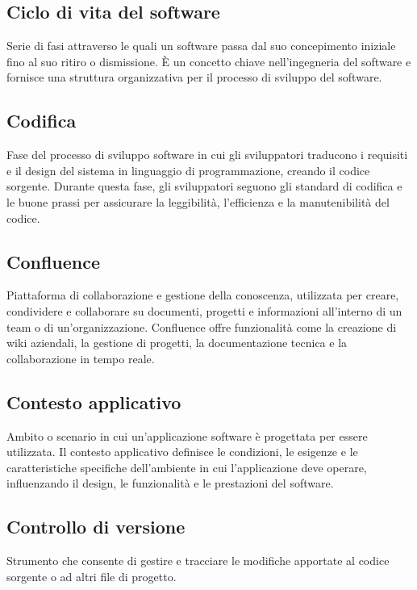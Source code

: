 \hypertarget{sec:ciclo_di_vita}{}
\subsection*{Ciclo di vita del software}
Serie di fasi attraverso le quali un software passa dal suo concepimento iniziale fino al suo ritiro o dismissione. È un concetto chiave nell'ingegneria 
del software e fornisce una struttura organizzativa per il processo di sviluppo del software.

\hypertarget{sec:codifica}{}
\subsection*{Codifica}
Fase del processo di sviluppo software in cui gli sviluppatori traducono i requisiti e il design del sistema in linguaggio di programmazione, creando il 
codice sorgente. Durante questa fase, gli sviluppatori seguono gli standard di codifica e le buone prassi per assicurare la leggibilità, l’efficienza e la 
manutenibilità del codice.

\hypertarget{sec:confluence}{}
\subsection*{Confluence}
Piattaforma di collaborazione e gestione della conoscenza, utilizzata per creare, condividere e collaborare su documenti, progetti e informazioni all'interno 
di un team o di un'organizzazione. Confluence offre funzionalità come la creazione di wiki aziendali, la gestione di progetti, la documentazione tecnica e la 
collaborazione in tempo reale.

\hypertarget{sec:contesto_applicativo}{}
\subsection*{Contesto applicativo}
Ambito o scenario in cui un'applicazione software è progettata per essere utilizzata. Il contesto applicativo definisce le condizioni, le esigenze e le
caratteristiche specifiche dell'ambiente in cui l'applicazione deve operare, influenzando il design, le funzionalità e le prestazioni del software.

\hypertarget{sec:controllo_versione}{}
\subsection*{Controllo di versione}
Strumento che consente di gestire e tracciare le modifiche apportate al codice sorgente o ad altri file di progetto.

\newpage